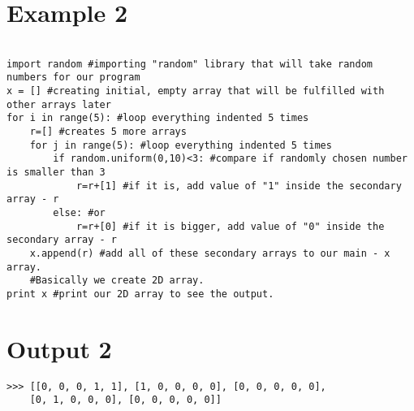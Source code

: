\vspace{1cm}

\section{Example 2}   

\scriptsize
\begin{shaded}
\begin{verbatim}

import random #importing "random" library that will take random numbers for our program
x = [] #creating initial, empty array that will be fulfilled with other arrays later
for i in range(5): #loop everything indented 5 times
    r=[] #creates 5 more arrays
    for j in range(5): #loop everything indented 5 times
        if random.uniform(0,10)<3: #compare if randomly chosen number is smaller than 3
            r=r+[1] #if it is, add value of "1" inside the secondary array - r
        else: #or
            r=r+[0] #if it is bigger, add value of "0" inside the secondary array - r
    x.append(r) #add all of these secondary arrays to our main - x array. 
    #Basically we create 2D array.
print x #print our 2D array to see the output.

\end{verbatim}
\end{shaded}

\normalsize
\section{Output 2}
\begin{shaded}
\begin{verbatim}
>>> [[0, 0, 0, 1, 1], [1, 0, 0, 0, 0], [0, 0, 0, 0, 0],
    [0, 1, 0, 0, 0], [0, 0, 0, 0, 0]]
\end{verbatim}
\end{shaded}
   